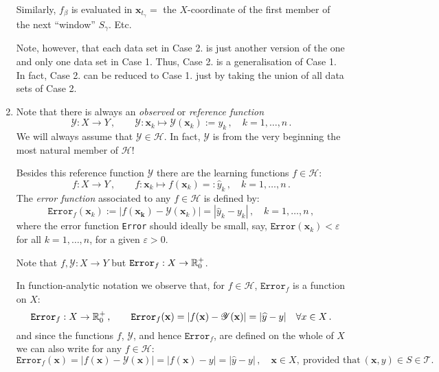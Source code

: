 \begin{description}[style=unboxed,leftmargin=0cm,itemsep=3ex]
\begin{enumerate}
Similarly, $f_\beta$ is evaluated in $\mathbf{x}_{t_\gamma}=$ the $X$-coordinate
of the first member of the next ``window'' $S_\gamma$.
Etc.

Note, however, that each data set in Case 2. is just another version of
the one and only one data set in Case 1.
Thus, Case 2. is  a generalisation of Case 1.
In fact, Case 2. can be reduced to Case 1. just by taking the union of
all data sets of Case 2.


\item\label{referenceFunction}
Note that there is always an {\em observed\/} or {\em reference function\/}
$$
\mathscr{Y}:X\to Y\,,\qquad
\mathscr{Y}: \mathbf{x}_k \mapsto \mathscr{Y}(\mathbf{x}_k):=y_k\,,
\quad k=1,\dots,n\,.
$$
We will always assume that $\mathscr{Y}\in\mathscr{H}$.
In fact, $\mathscr{Y}$ is from the very beginning the most natural member
of $\mathscr{H}$!

Besides this reference function $\mathscr{Y}$ there are the learning
functions
$f\in\mathscr{H}$:
$$
f:X\to Y\,,\qquad
f: \mathbf{x}_k \mapsto f(\mathbf{x}_k)=:\widehat{y}_k\,,
\quad k=1,\dots,n\,.
$$
The {\em error function\/} associated to any $f\in\mathscr{H}$
is defined by:
$$
\texttt{Error}_f(\mathbf{x}_k)
:=|f(\mathbf{x_k})-\mathscr{Y}(\mathbf{x}_k)|=|\widehat{y}_k-y_k|\,,
\quad k=1,\dots,n\,,
$$
where the error function \texttt{Error} should ideally be small, say, 
$\texttt{Error}(\mathbf{x}_k)<\varepsilon$ for all $k=1,\dots,n$, for
a given $\varepsilon>0$.

Note that $f,\mathscr{Y}:X\to Y$ but $\texttt{Error}_f:X\to{\mathbb R }_0^+$.

In function-analytic notation we observe that, for $f\in\mathscr{H}$,
$\texttt{Error}_f$ is a function on $X$:
$$
\texttt{Error}_f:X\to{\mathbb R }_0^+\,,\qquad
\texttt{Error}_f(\mathbf{x}) 
= |f(\mathbf{x})-\mathscr{Y}(\mathbf{x})| 
= |\widehat{y} - y| \quad\forall x\in X\,.
$$
and since the functions $f$, $\mathscr{Y}$, and hence $\texttt{Error}_f$,
are defined on the whole of $X$ we can also write for any
$f\in\mathscr{H}$:
$$
\texttt{Error}_f(\mathbf{x})
= |f(\mathbf{x})-\mathscr{Y}(\mathbf{x})| 
= |f(\mathbf{x}) - y| = |\widehat{y} - y|\,,\quad \mathbf{x}\in X,\ 
\text{provided that}\ (\mathbf{x},y)\in S\in\mathscr{T}.
$$


\end{enumerate}
\end{description}
